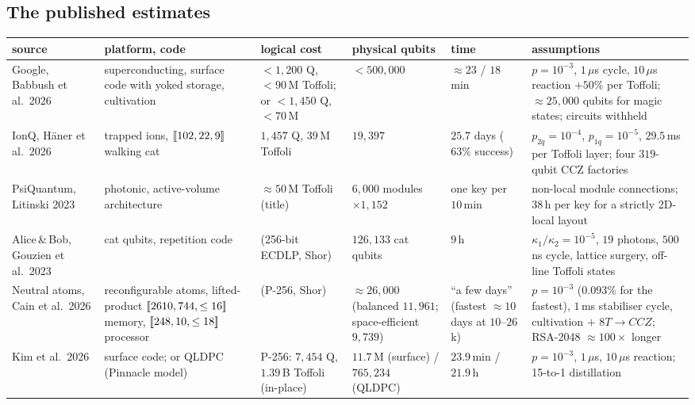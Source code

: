 \subsection{The published estimates}
\begin{table}[H]
\centering\scriptsize
\setlength{\tabcolsep}{3pt}
\begin{tabular}{@{}p{2.8cm}p{2.4cm}p{2.4cm}p{2.1cm}p{2.0cm}p{3.5cm}@{}}
\toprule
source & platform, code & logical cost & physical qubits & time & assumptions\\
\midrule
Google, Babbush et al.\ 2026 \cite{babbush26} & superconducting, surface code with yoked storage, cultivation & $<1{,}200$ Q, $<90$\,M Toffoli; or $<1{,}450$ Q, $<70$\,M & $<500{,}000$ & $\approx23$ / $18$\,min & $p=10^{-3}$, $1\,\mu$s cycle, $10\,\mu$s reaction $+50\%$ per Toffoli; $\approx25{,}000$ qubits for magic states; circuits withheld\\
IonQ, H\"aner et al.\ 2026 \cite{haener26,walkingcat26} & trapped ions, $[\![102,22,9]\!]$ walking cat & $1{,}457$ Q, $39$\,M Toffoli & $19{,}397$ & $25.7$ days ($63\%$ success) & $p_{2q}=10^{-4}$, $p_{1q}=10^{-5}$, $29.5$\,ms per Toffoli layer; four $319$-qubit CCZ factories\\
PsiQuantum, Litinski 2023 \cite{litinski23,litinski22active} & photonic, active-volume architecture & $\approx50$\,M Toffoli (title) & $6{,}000$ modules $\times1{,}152$ & one key per $10$\,min & non-local module connections; $38$\,h per key for a strictly 2D-local layout\\
Alice\,\&\,Bob, Gouzien et al.\ 2023 \cite{gouzien23} & cat qubits, repetition code & (256-bit ECDLP, Shor) & $126{,}133$ cat qubits & $9$\,h & $\kappa_1/\kappa_2=10^{-5}$, $19$ photons, $500$\,ns cycle, lattice surgery, off-line Toffoli states\\
Neutral atoms, Cain et al.\ 2026 \cite{cain26} & reconfigurable atoms, lifted-product $[\![2610,744,\le16]\!]$ memory, $[\![248,10,\le18]\!]$ processor & (P-256, Shor) & $\approx26{,}000$ (balanced $11{,}961$; space-efficient $9{,}739$) & ``a few days'' (fastest $\approx10$ days at $10$--$26$k) & $p=10^{-3}$ ($0.093\%$ for the fastest), $1$\,ms stabiliser cycle, cultivation $+$ $8T\!\to\!CCZ$; RSA-2048 $\approx100\times$ longer\\
Kim et al.\ 2026 \cite{kim26} & surface code; or QLDPC (Pinnacle model) & P-256: $7{,}454$ Q, $1.39$\,B Toffoli (in-place) & $11.7$\,M (surface) / $765{,}234$ (QLDPC) & $23.9$\,min / $21.9$\,h & $p=10^{-3}$, $1\,\mu$s, $10\,\mu$s reaction; 15-to-1 distillation\\

\end{tabular}
\end{table}
